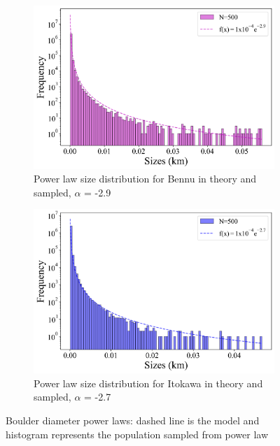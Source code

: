 \begin{figure}[H]
    \begin{subfigure}{0.49\textwidth}
        \centering
        \includegraphics[width=\textwidth]{fig/boulder_size_dist_bennu.png}
        \caption{Power law size distribution for Bennu in theory and sampled, $\alpha$ = -2.9}
    \end{subfigure}
    \hfill
    \begin{subfigure}{0.49\textwidth}
        \centering
        \includegraphics[width=\textwidth]{fig/boulder_size_dist_itokawa.png}
        \caption{Power law size distribution for Itokawa in theory and sampled, $\alpha$ = -2.7}
    \end{subfigure}  
    \caption{Boulder diameter power laws: dashed line is the model and histogram represents the population sampled from power law}
    \label{fig:all_size}
\end{figure}

